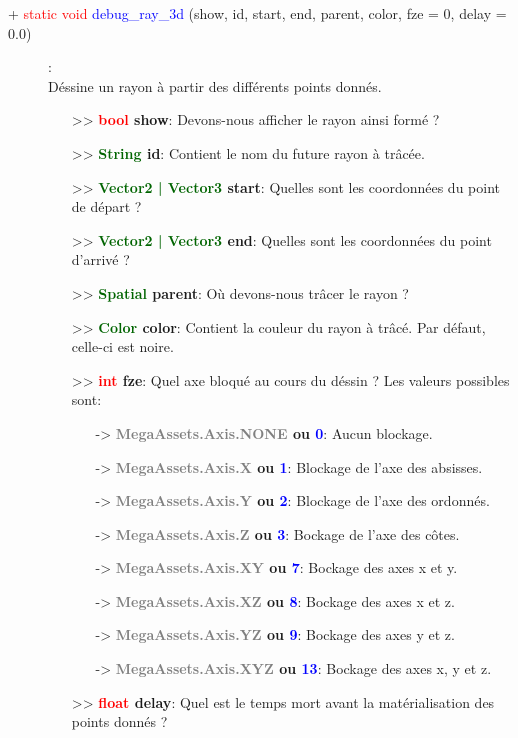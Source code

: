 \documentclass[a4paper, 11pt]{article}
\begin{document}
	\begin{description}
		\item [+ \textcolor{red}{static void} \textcolor{blue}{debug\_ray\_3d} (show, id, start, end, 
		parent, color, fze = 0, delay = 0.0)]: \\Déssine un rayon à partir des différents points donnés.
		\begin{itemize}
			\item[>> \textbf{\textcolor{red}{bool} show}:] Devons-nous afficher le rayon ainsi formé ?
			\item[>> \textbf{\textcolor{darkgreen}{String} id}:] Contient le nom du future rayon à trâcée.
			\item[>> \textbf{\textcolor{darkgreen}{Vector2 | Vector3} start}:] Quelles sont les coordonnées 
			du point de départ ?
			\item[>> \textbf{\textcolor{darkgreen}{Vector2 | Vector3} end}:] Quelles sont les coordonnées du 
			point d'arrivé ?
			\item[>> \textbf{\textcolor{darkgreen}{Spatial} parent}:] Où devons-nous trâcer le rayon ?
			\item[>> \textbf{\textcolor{darkgreen}{Color} color}:] Contient la couleur du rayon à trâcé. Par 
			défaut, celle-ci est noire.
			\item[>> \textbf{\textcolor{red}{int} fze}:] Quel axe bloqué au cours du déssin ? Les valeurs 
			possibles sont:
			\begin{itemize}
				\item [-> \textbf{\textcolor{gray}{MegaAssets.Axis.NONE} ou \textcolor{blue}{0}}:] Aucun 
				blockage.
				\item [-> \textbf{\textcolor{gray}{MegaAssets.Axis.X} ou \textcolor{blue}{1}}:] Blockage de
				l'axe des absisses.
				\item [-> \textbf{\textcolor{gray}{MegaAssets.Axis.Y} ou \textcolor{blue}{2}}:] Blockage de
				l'axe des ordonnés.
				\item [-> \textbf{\textcolor{gray}{MegaAssets.Axis.Z} ou \textcolor{blue}{3}}:] Bockage de
				l'axe des côtes.
				\item [-> \textbf{\textcolor{gray}{MegaAssets.Axis.XY} ou \textcolor{blue}{7}}:] Bockage des
				axes x et y.
				\item [-> \textbf{\textcolor{gray}{MegaAssets.Axis.XZ} ou \textcolor{blue}{8}}:] Bockage des
				axes x et z.
				\item [-> \textbf{\textcolor{gray}{MegaAssets.Axis.YZ} ou \textcolor{blue}{9}}:] Bockage des
				axes y et z.
				\item [-> \textbf{\textcolor{gray}{MegaAssets.Axis.XYZ} ou \textcolor{blue}{13}}:] Bockage
				des axes x, y et z.
			\end{itemize}
			\item[>> \textbf{\textcolor{red}{float} delay}:] Quel est le temps mort avant la matérialisation 
			des points donnés ?\\
		\end{itemize}
	\end{description}
\end{document}

